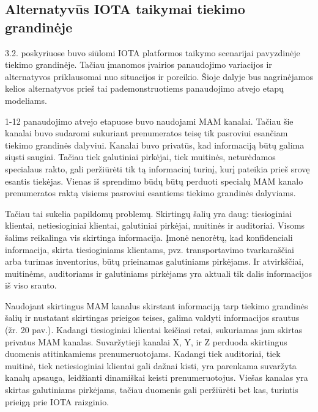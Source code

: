 
\subsection{Alternatyvūs IOTA taikymai tiekimo grandinėje}

3.2. poskyriuose buvo siūlomi IOTA platformos taikymo scenarijai pavyzdinėje tiekimo grandinėje. Tačiau įmanomos įvairios panaudojimo variacijos ir alternatyvos priklausomai nuo situacijos ir poreikio. Šioje dalyje bus nagrinėjamos kelios alternatyvos prieš tai pademonstruotiems panaudojimo atvejo etapų modeliams.

1-12 panaudojimo atvejo etapuose buvo naudojami MAM kanalai. Tačiau šie kanalai buvo sudaromi sukuriant prenumeratos teisę tik pasroviui esančiam tiekimo grandinės dalyviui. Kanalai buvo privatūs, kad informaciją būtų galima siųsti saugiai. Tačiau tiek galutiniai pirkėjai, tiek muitinės, neturėdamos specialaus rakto, gali peržiūrėti tik tą informacinį turinį, kurį pateikia prieš srovę esantis tiekėjas. Vienas iš sprendimo būdų būtų perduoti specialų MAM kanalo prenumeratos raktą visiems pasroviui esantiems tiekimo grandinės dalyviams.

Tačiau tai sukelia papildomų problemų. Skirtingų šalių yra daug: tiesioginiai klientai, netiesioginiai klientai, galutiniai pirkėjai, muitinės ir auditoriai. Visoms šalims reikalinga vis skirtinga informacija. Įmonė nenorėtų, kad konfidenciali informacija, skirta tiesioginiams klientams, pvz. transportavimo tvarkaraščiai arba turimas inventorius, būtų prieinamas galutiniams pirkėjams. Ir atvirkščiai, muitinėms, auditoriams ir galutiniams pirkėjams yra aktuali tik dalis informacijos iš viso srauto.

Naudojant skirtingus MAM kanalus skirstant informaciją tarp tiekimo grandinės šalių ir nustatant skirtingas prieigos teises, galima valdyti informacijos srautus (žr. 20 pav.). Kadangi tiesioginiai klientai keičiasi retai, sukuriamas jam skirtas privatus MAM kanalas. Suvaržytieji kanalai X, Y, ir Z perduoda skirtingus duomenis atitinkamiems prenumeruotojams. Kadangi tiek auditoriai, tiek muitinė, tiek netiesioginiai klientai gali dažnai kisti, yra parenkama suvaržyta kanalų apsauga, leidžianti dinamiškai keisti prenumeruotojus. Viešas kanalas yra skirtas galutiniams pirkėjams, tačiau duomenis gali peržiūrėti bet kas, turintis prieigą prie IOTA raizginio.

